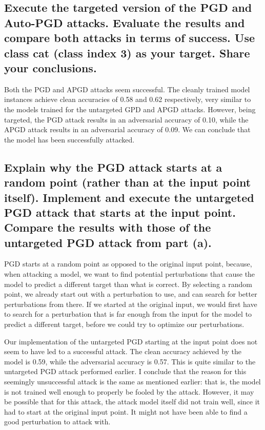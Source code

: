 \documentclass{article}
\begin{document}
\subsection{Execute the targeted version of the PGD and Auto-PGD attacks.
Evaluate the results and compare both attacks in terms of success. Use class
cat (class index 3) as your target. Share your conclusions.}
Both the PGD and APGD attacks seem successful.
The cleanly trained model instances achieve clean accuracies of 0.58 and 0.62 respectively, very similar to the models trained for the untargeted GPD and APGD attacks.
However, being targeted, the PGD attack results in an adversarial accuracy of 0.10, while the APGD attack results in an adversarial accuracy of 0.09.
We can conclude that the model has been successfully attacked.

\subsection{Explain why the PGD attack starts at a random point (rather than
at the input point itself). Implement and execute the untargeted PGD attack
that starts at the input point. Compare the results with those of the untargeted
PGD attack from part (a).}
PGD starts at a random point as opposed to the original input point, because, when attacking a model, we want to find potential perturbations that cause the model to predict a different target than what is correct.
By selecting a random point, we already start out with a perturbation to use, and can search for better perturbations from there.
If we started at the original input, we would first have to search for a perturbation that is far enough from the input for the model to predict a different target, before we could try to optimize our perturbations.

Our implementation of the untargeted PGD starting at the input point does not seem to have led to a successful attack.
The clean accuracy achieved by the model is 0.59, while the adversarial accuracy is 0.57.
This is quite similar to the untargeted PGD attack performed earlier.
I conclude that the reason for this seemingly unsuccessful attack is the same as mentioned earlier: that is, the model is not trained well enough to properly be fooled by the attack.
However, it may be possible that for this attack, the attack model itself did not train well, since it had to start at the original input point.
It might not have been able to find a good perturbation to attack with.
\end{document}
